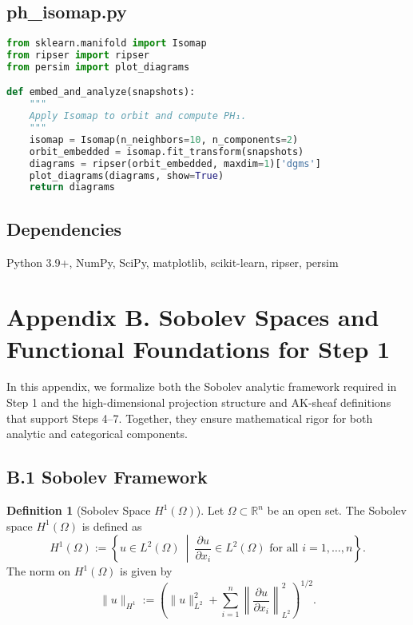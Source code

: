 \documentclass[11pt]{article}
\theoremstyle{definition}
\newtheorem{definition}[theorem]{Definition}
\begin{document}
\subsection*{ph\_isomap.py}
\begin{lstlisting}[language=Python]
from sklearn.manifold import Isomap
from ripser import ripser
from persim import plot_diagrams

def embed_and_analyze(snapshots):
    """
    Apply Isomap to orbit and compute PH₁.
    """
    isomap = Isomap(n_neighbors=10, n_components=2)
    orbit_embedded = isomap.fit_transform(snapshots)
    diagrams = ripser(orbit_embedded, maxdim=1)['dgms']
    plot_diagrams(diagrams, show=True)
    return diagrams
\end{lstlisting}

\subsection*{Dependencies}
Python 3.9+, NumPy, SciPy, matplotlib, scikit-learn, ripser, persim


\section*{Appendix B. Sobolev Spaces and Functional Foundations for Step 1}

In this appendix, we formalize both the Sobolev analytic framework required in Step 1 and the high-dimensional projection structure and AK-sheaf definitions that support Steps 4--7. Together, they ensure mathematical rigor for both analytic and categorical components.

\subsection*{B.1 Sobolev Framework}

\begin{definition}[Sobolev Space \( H^1(\Omega) \)]
Let \( \Omega \subset \mathbb{R}^n \) be an open set. The Sobolev space \( H^1(\Omega) \) is defined as
\[
H^1(\Omega) := \left\{ u \in L^2(\Omega) \ \middle| \ \frac{\partial u}{\partial x_i} \in L^2(\Omega) \text{ for all } i = 1,\dots,n \right\}.
\]
The norm on \( H^1(\Omega) \) is given by
\[
\|u\|_{H^1} := \left( \|u\|_{L^2}^2 + \sum_{i=1}^n \left\| \frac{\partial u}{\partial x_i} \right\|_{L^2}^2 \right)^{1/2}.
\]
\end{definition}
\end{document}
